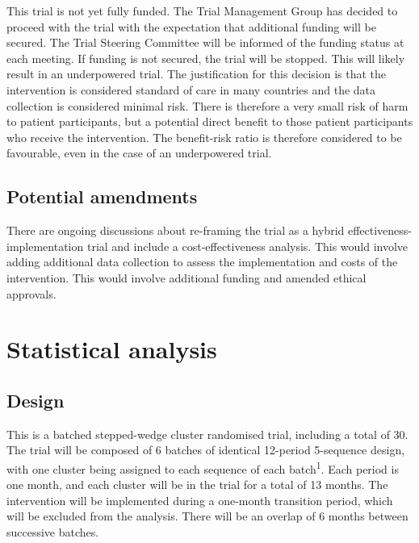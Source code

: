 \documentclass[
]{scrartcl}
\begin{document}
This trial is not yet fully funded. The Trial Management Group has
decided to proceed with the trial with the expectation that additional
funding will be secured. The Trial Steering Committee will be informed
of the funding status at each meeting. If funding is not secured, the
trial will be stopped. This will likely result in an underpowered trial.
The justification for this decision is that the intervention is
considered standard of care in many countries and the data collection is
considered minimal risk. There is therefore a very small risk of harm to
patient participants, but a potential direct benefit to those patient
participants who receive the intervention. The benefit-risk ratio is
therefore considered to be favourable, even in the case of an
underpowered trial.

\hypertarget{potential-amendments}{%
\subsection{Potential amendments}\label{potential-amendments}}

There are ongoing discussions about re-framing the trial as a hybrid
effectiveness-implementation trial and include a cost-effectiveness
analysis. This would involve adding additional data collection to assess
the implementation and costs of the intervention. This would involve
additional funding and amended ethical approvals.

\newpage{}

\hypertarget{statistical-analysis}{%
\section{Statistical analysis}\label{statistical-analysis}}

\hypertarget{design}{%
\subsection{Design}\label{design}}

This is a batched stepped-wedge cluster randomised trial, including a
total of 30. The trial will be composed of 6 batches of identical
12-period 5-sequence design, with one cluster being assigned to each
sequence of each batch\textsuperscript{1}. Each period is one month, and
each cluster will be in the trial for a total of 13 months. The
intervention will be implemented during a one-month transition period,
which will be excluded from the analysis. There will be an overlap of 6
months between successive batches.
\end{document}
